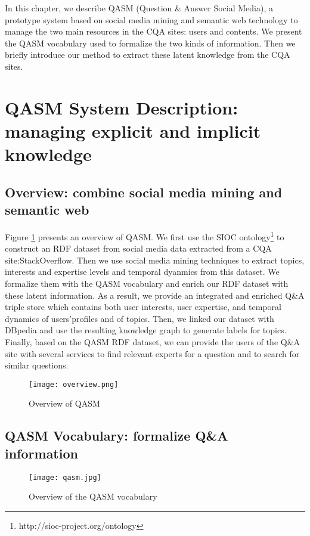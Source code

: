 
In this chapter, we describe QASM (Question \& Answer Social Media), a prototype system based on social media mining and semantic web technology to manage the two main resources in the CQA sites: users and contents. We present the QASM vocabulary used to formalize  the two kinds of information. Then we briefly introduce our method to extract these latent knowledge from the CQA sites.


\section{QASM System Description: managing explicit and implicit knowledge}
\subsection{Overview: combine social media mining and semantic web}
Figure \ref{fig:overview} presents an overview of QASM. We first use the SIOC ontology\footnote{http://sioc-project.org/ontology} to construct an RDF dataset from social media data extracted from a CQA site:StackOverflow. Then we use social media mining techniques to extract topics, interests and expertise levels and temporal dyanmics from this dataset. We formalize them with the QASM vocabulary and enrich our RDF dataset with these latent information. As a result, we provide an integrated and enriched Q\&A triple store which contains both user interests, user expertise, and temporal dynamics of users'profiles and of topics. Then, we linked our dataset with DBpedia and use the resulting knowledge graph to generate labels for topics. Finally, based on the QASM RDF dataset, we can provide the users of the Q\&A site with several services to find relevant experts for a question and to search for similar questions.

\begin{figure}%
\centering
\texttt{[image: overview.png]}  
\caption{Overview of QASM}
\label{fig:overview} 
\end{figure}

\subsection{QASM Vocabulary: formalize Q\&A information}
\begin{sidewaysfigure}
\centering
\texttt{[image: qasm.jpg]}
\caption{Overview of the QASM vocabulary}
\label{fig:coreontology} 
\end{sidewaysfigure}

